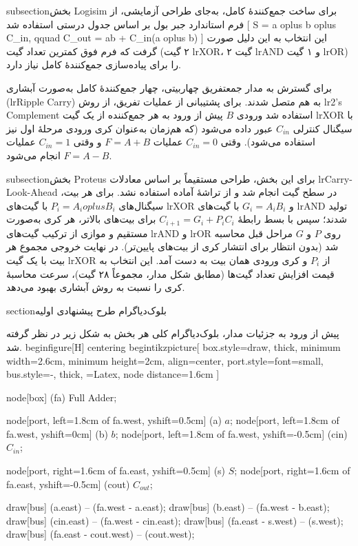 subsection{بخش Logisim}
برای ساخت جمع‌کنندهٔ کامل، به‌جای طراحی آزمایشی، از فرم استاندارد جبر بول بر اساس جدول درستی استفاده شد
[
S = a oplus b oplus C_{in}, qquad C_{out} = ab + C_{in}(a oplus b)
]
این انتخاب به این دلیل صورت گرفت که فرم فوق کمترین تعداد گیت (۲ گیت lr{XOR}، ۲ گیت lr{AND} و ۱ گیت lr{OR}) را برای پیاده‌سازی جمع‌کنندهٔ کامل نیاز دارد.

برای گسترش به مدار جمعتفریق چهاربیتی، چهار جمع‌کنندهٔ کامل به‌صورت آبشاری (lr{Ripple Carry}) به هم متصل شدند. برای پشتیبانی از عملیات تفریق، از روش lr{2's Complement} استفاده شد ورودی $B$ پیش از ورود به هر جمع‌کننده از یک گیت lr{XOR} با سیگنال کنترلی $C_{in}$ عبور داده می‌شود (که هم‌زمان به‌عنوان کری ورودی مرحلهٔ اول نیز استفاده می‌شود). وقتی $C_{in}=0$ عملیات $F=A+B$ و وقتی $C_{in}=1$ عملیات $F=A-B$ انجام می‌شود.

subsection{بخش Proteus}
برای این بخش، طراحی مستقیماً بر اساس معادلات lr{Carry-Look-Ahead} در سطح گیت انجام شد و از تراشهٔ آماده استفاده نشد. برای هر بیت، سیگنال‌های $P_i=A_ioplus B_i$ با گیت‌های lr{XOR} و $G_i=A_iB_i$ با گیت‌های lr{AND} تولید شدند؛ سپس با بسط رابطهٔ $C_{i+1}=G_i+P_iC_i$ برای بیت‌های بالاتر، هر کری به‌صورت مستقیم و موازی از ترکیب گیت‌های lr{AND} و lr{OR} روی $P$ و $G$ مراحل قبل محاسبه شد (بدون انتظار برای انتشار کری از بیت‌های پایین‌تر). در نهایت خروجی مجموع هر بیت با یک گیت lr{XOR} از $P_i$ و کری ورودی همان بیت به دست آمد. این انتخاب به قیمت افزایش تعداد گیت‌ها (مطابق شکل مدار، مجموعاً ۲۸ گیت)، سرعت محاسبهٔ کری را نسبت به روش آبشاری بهبود می‌دهد.


section{بلوک‌دیاگرام طرح پیشنهادی اولیه}

پیش از ورود به جزئیات مدار، بلوک‌دیاگرام کلی هر بخش به شکل زیر در نظر گرفته شد.
begin{figure}[H]
centering
begin{tikzpicture}[
  box.style={draw, thick, minimum width=2.6cm, minimum height=2cm, align=center},
  port.style={font=small},
  bus.style={-, thick},
  =Latex,
  node distance=1.6cm
]

node[box] (fa) {Full Adder};

node[port, left=1.8cm of fa.west, yshift=0.5cm]  (a)   {$a$};
node[port, left=1.8cm of fa.west, yshift=0cm]    (b)   {$b$};
node[port, left=1.8cm of fa.west, yshift=-0.5cm] (cin) {$C_{in}$};

node[port, right=1.6cm of fa.east, yshift=0.5cm]  (s)    {$S$};
node[port, right=1.6cm of fa.east, yshift=-0.5cm] (cout) {$C_{out}$};

draw[bus] (a.east)   -- (fa.west - a.east);
draw[bus] (b.east)   -- (fa.west - b.east);
draw[bus] (cin.east) -- (fa.west - cin.east);
draw[bus] (fa.east - s.west)    -- (s.west);
draw[bus] (fa.east - cout.west) -- (cout.west);

